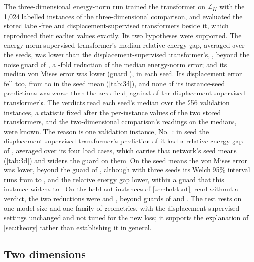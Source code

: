 The three-dimensional energy-norm run trained the transformer on $\mathcal{L}_K$ with the
1,024 labelled instances of the three-dimensional comparison, and evaluated the stored
label-free and displacement-supervised transformers beside it, which reproduced their
earlier values exactly. Its two hypotheses were supported. The energy-norm-supervised
transformer's median relative energy gap, \numKdKnormGapMedian{} averaged over the seeds,
was \numKdGapRel{} lower than the displacement-supervised transformer's,
\numKdLabGapMedian{}, beyond the noise guard of \numKdGapTau{}, a \numNlThreeNormE{}-fold
reduction of the median energy-norm error; and its median von Mises error was \numKdVmRel{}
lower (guard \numKdVmTau{}), in each seed. Its displacement error fell too, from
\numThreeLabDisp{} to \numThreeKnormDisp{} in the seed mean (\cref{tab:3d}), and none of its
\numThreePairs{} instance-seed predictions was worse than the zero field, against
\numThreeLabWorse{} of the displacement-supervised transformer's. The verdicts read each
seed's median over the 256 validation instances, a statistic fixed after the per-instance
values of the two stored transformers, and the two-dimensional comparison's readings on the
medians, were known. The reason is one validation instance, No.~\numWorstIndex{}: in seed
\numThreeLabWorstSeed{} the displacement-supervised transformer's prediction of it had a
relative energy gap of \numThreeLabWorst{}, averaged over its four load cases, which carries
that network's seed means (\cref{tab:3d}) and widens the guard on them. On the seed means
the von Mises error was \numKdMeansVmRel{} lower, beyond the guard of \numKdMeansVmTau{},
although with three seeds its Welch 95\% interval runs from \numKdMeansVmWelchLow{} to
\numKdMeansVmWelchHigh{}, and the relative energy gap \numKdMeansGapRel{} lower, within a
guard that this instance widens to \numKdMeansGapTau{}. On the \numHoldThreeN{} held-out
instances of \cref{sec:holdout}, read without a verdict, the two reductions were
\numKdHoldGapRel{} and \numKdHoldVmRel{}, beyond guards of \numKdHoldGapTau{} and
\numKdHoldVmTau{}. The test rests on one model size and one family of geometries, with the
displacement-supervised settings unchanged and not tuned for the new loss; it supports the
explanation of \cref{sec:theory} rather than establishing it in general.

\subsection{Two dimensions}\label{sec:norm:two}

